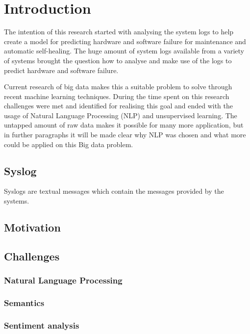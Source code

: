 \chapter{Introduction} \label{ch:introduction}
The intention of this research started with analysing the system logs to help create a model for predicting hardware and software failure for maintenance and automatic self-healing. The huge amount of system logs available from a variety of systems brought the question how to analyse and make use of the logs to predict hardware and software failure.

Current research of big data makes this a suitable problem to solve through recent machine learning techniques. 
During the time spent on this research challenges were met and identified for realising this goal and ended with the usage of Natural Language Processing (NLP) and unsupervised learning.  The untapped amount of raw data makes it possible for many more application, but in further paragraphs it will be made clear why NLP was chosen and what more could be applied on this Big data problem.
 
 
\section{Syslog} 
Syslogs are textual messages \cite{Stearley2004TowardsSyslogs} which contain the messages provided by the systems.

\section{Motivation}


\section{Challenges}

\subsection{Natural Language Processing}


\subsection{Semantics}


\subsection{Sentiment analysis}


